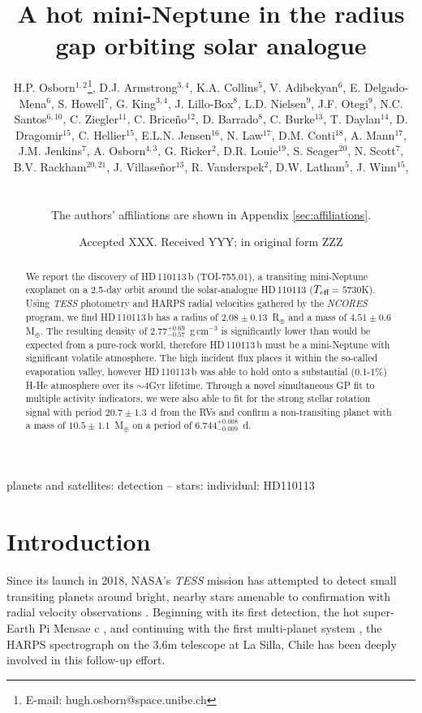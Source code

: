 \documentclass[fleqn,usenatbib]{mnras}
\title[\Tplanet{}]{A hot mini-Neptune in the radius gap orbiting solar analogue \Tstar{}}
\author[H.P. Osborn et al.]{\parbox{\textwidth}{H.P. Osborn$^{1,2}$\thanks{E-mail: hugh.osborn@space.unibe.ch}, 
D.J. Armstrong$^{3,4}$, %
K.A. Collins$^{5}$, %
V. Adibekyan$^{6}$, %
E. Delgado-Mena$^{6}$, %
S. Howell$^{7}$, %
G. King$^{3,4}$, %
J. Lillo-Box$^{8}$, %
L.D. Nielsen$^{9}$, %
J.F. Otegi$^{9}$, %
N.C. Santos$^{6,10}$, %
C. Ziegler$^{11}$, %
C. Brice\~{n}o$^{12}$, %
D. Barrado$^{8}$, %
C. Burke$^{13}$, %
T. Daylan$^{14}$, %
D. Dragomir$^{15}$, %
C. Hellier$^{15}$, %
E.L.N. Jensen$^{16}$, %
N. Law$^{17}$, %
D.M. Conti$^{18}$, %
A. Mann$^{17}$, %
J.M. Jenkins$^{7}$, %
A. Osborn$^{4,3}$, %
G. Ricker$^{2}$, %
D.R. Louie$^{19}$, %
S. Seager$^{20}$, %
N. Scott$^{7}$, %
B.V. Rackham$^{20,21}$, %
J. Villaseñor$^{13}$, %
R. Vanderspek$^{2}$, %
D.W. Latham$^{5}$, %
J. Winn$^{15}$, %
}\\
\parbox{\textwidth}{
The authors' affiliations are shown in Appendix \ref{sec:affiliations}.}
}
\date{Accepted XXX. Received YYY; in original form ZZZ}
\newcommand{\gcm}{g\,cm$^{-3}$}	%
\newcommand{\tess}{{\it TESS}}
\newcommand{\harps}{{HARPS}}
\newcommand{\rearth}{R$_{\oplus}$}
\newcommand{\mearth}{M$_{\oplus}$}
\newcommand{\teff}{$T_{\rm eff}$}
\newcommand{\TPone}{ $ 6.744^{+0.008}_{-0.009} $ }
\newcommand{\TMpzero}{ $ 4.51 \pm 0.6 $ }
\newcommand{\TMpone}{ $ 10.5 \pm 1.1 $ }
\newcommand{\Trpl}{ $ 2.08 \pm 0.13 $ }
\newcommand{\Trhopgcmthree}{ $ 2.77^{+0.69}_{-0.57} $ }
\newcommand{\Tperiod}{ $ 20.7 \pm 1.3 $ }
\newcommand{\TTplanet}{TOI-755.01}
\newcommand{\Tstar}{HD\,110113}
\newcommand{\Tplanet}{HD\,110113\,b}
\begin{document}
\label{firstpage}
\pagerange{\pageref{firstpage}--\pageref{lastpage}}
\maketitle

\begin{abstract}
We report the discovery of \Tplanet{} (\TTplanet{}), a transiting mini-Neptune exoplanet on a 2.5-day orbit around the solar-analogue \Tstar{} (\teff{}= $5730$K).
Using \tess{} photometry and \harps{} radial velocities gathered by the \textit{NCORES} program, we find \Tplanet{} has a radius of \Trpl{}\,\rearth{} and a mass of \TMpzero{}\,\mearth{}.
The resulting density of \Trhopgcmthree{}\,\gcm{} is significantly lower than would be expected from a pure-rock world, therefore \Tplanet{} must be a mini-Neptune with significant volatile atmosphere.
The high incident flux places it within the so-called evaporation valley, however \Tplanet{} was able to hold onto a substantial (0.1-1\%) H-He atmosphere over its $\sim4$Gyr lifetime.
Through a novel simultaneous GP fit to multiple activity indicators, we were also able to fit for the strong stellar rotation signal with period \Tperiod{}\,d from the RVs and confirm a non-transiting planet with a mass of \TMpone{}\,\mearth{} on a period of \TPone{}\,d.
\end{abstract}

\begin{keywords}
planets and satellites: detection -- stars: individual: HD110113
\end{keywords}



\section{Introduction}
Since its launch in 2018, NASA's \tess{} mission has attempted to detect small transiting planets around bright, nearby stars amenable to confirmation with radial velocity observations \citep{ricker2010transiting}.
Beginning with its first detection, the hot super-Earth Pi Mensae c \citep{huang2018tess}, and continuing with the first multi-planet system \citep[TOI-125][]{quinn2019near,nielsen2020mass}, the \harps{} spectrograph on the 3.6m telescope at La Silla, Chile \citep{2003Msngr.114...20M} has been deeply involved in this follow-up effort.
\end{document}
